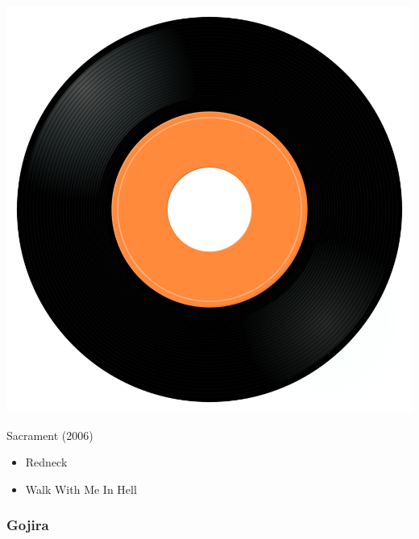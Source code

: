 \begin{minipage}[t]{0.25\textwidth}\vspace{0pt}
\captionsetup{type=figure}
\includegraphics[width=\textwidth]{Images/cover.png}
\caption*{Sacrament (2006)}
\end{minipage}
\begin{minipage}[t]{0.25\textwidth}\vspace{0pt}
\begin{itemize}[nosep,leftmargin=1em,labelwidth=*,align=left]
	\setlength{\itemsep}{0pt}
	\item Redneck
	\item Walk With Me In Hell
\end{itemize}
\end{minipage}

\subsubsection{Gojira}


